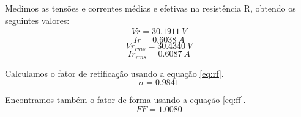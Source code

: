 \documentclass{report}
\begin{document}
Medimos as tensões e correntes médias e efetivas na resistência R, obtendo os seguintes valores:
\begin{equation}
\overline{Vr} = 30.1911\ V
\end{equation}
\begin{equation}
\overline{Ir} =  0.6038\ A
\end{equation}
\begin{equation}
Vr_{rms} =  30.4340\ V
\end{equation}
\begin{equation}
Ir_{rms} =    0.6087\ A
\end{equation}

Calculamos o fator de retificação usando a equação \ref{eq:rf}.
\begin{equation}
\sigma =  0.9841
\end{equation}

Encontramos também o fator de forma usando a equação \ref{eq:ff}.
\begin{equation}
FF = 1.0080
\end{equation}



\end{document}
